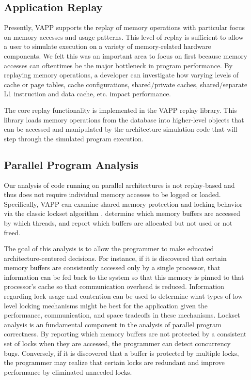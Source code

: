\subsection{Application Replay}
Presently, VAPP supports the replay of memory operations with
particular focus on memory accesses and usage patterns.  This
level of replay is sufficient to allow a user to simulate
execution on a variety of memory-related hardware components.
We felt this was an important area to focus on first because
memory accesses can oftentimes be the major bottleneck in program
performance.  By replaying memory operations, a developer can
investigate how varying levels of cache or page tables, cache 
configurations, shared/private caches, shared/separate L1 instruction
and data cache, etc. impact performance.

The core replay functionality is implemented in the VAPP replay
library.  This library loads memory operations from the database
into higher-level objects that can be accessed and manipulated
by the architecture simulation code that will step through
the simulated program execution.

\subsection{Parallel Program Analysis}
Our analysis of code running on parallel architectures is
not replay-based and thus does not require individual memory
accesses to be logged or loaded.  Specifically, VAPP can
examine shared memory protection and locking behavior via
the classic lockset algorithm \cite{savage1997eraser},
determine which memory buffers are accessed by which threads,
and report which buffers are allocated but not used or not freed.

The goal of this analysis is to allow the programmer to make
educated architecture-centered decisions.  For instance, if
it is discovered that certain memory buffers are consistently
accessed only by a single processor, that information can be
fed back to the system so that this memory is pinned to that
processor's cache so that communication overhead is reduced.
Information regarding lock usage and contention can be
used to determine what types of low-level locking mechanisms
might be best for the application given the performance, 
communication, and space tradeoffs in these mechanisms.
Lockset analysis is an fundamental component in the analysis
of parallel program correctness.  By reporting which
memory buffers are not protected by a consistent set of locks
when they are accessed, the programmer can detect concurrency
bugs.  Conversely, if it is discovered that a buffer is
protected by multiple locks, the programmer may realize that
certain locks are redundant and improve performance by eliminated
unneeded locks.

